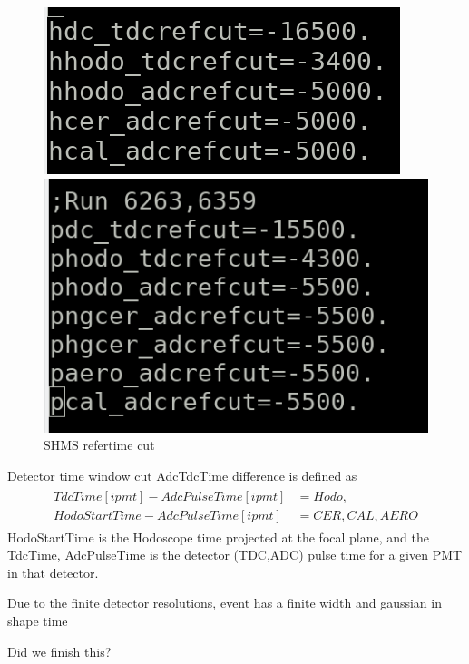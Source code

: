 \documentclass[10pt]{beamer}
\begin{document}
\begin{frame}{}
  \begin{figure}[!tbp]
  \centering
  \begin{minipage}[b]{0.4\textwidth}
    \includegraphics[width=\textwidth]{h_ref_cut.png}
    \caption{HMS refertime cut}
  \end{minipage}
  \hfill
  \begin{minipage}[b]{0.4\textwidth}
    \includegraphics[width=\textwidth]{p_ref_cut.png}
    \caption{SHMS refertime cut}
  \end{minipage}
\end{figure}
\end{frame}{}

\begin{frame}{Detector time window cut}
    AdcTdcTime difference is defined as
    \begin{align}\label{CSV(X)}
    \begin{split}
             TdcTime[ipmt]-AdcPulseTime[ipmt] &= Hodo, \\
        HodoStartTime - AdcPulseTime[ipmt] &=CER, CAL, AERO
    \end{split}
\end{align}
    HodoStartTime is the Hodoscope time projected at the focal plane, and the TdcTime, AdcPulseTime is the
detector (TDC,ADC) pulse time for a given PMT in that detector.

Due to the finite detector resolutions, event has
a finite width and gaussian in shape time

Did we finish this? 
    \end{frame}{}
\end{document}
